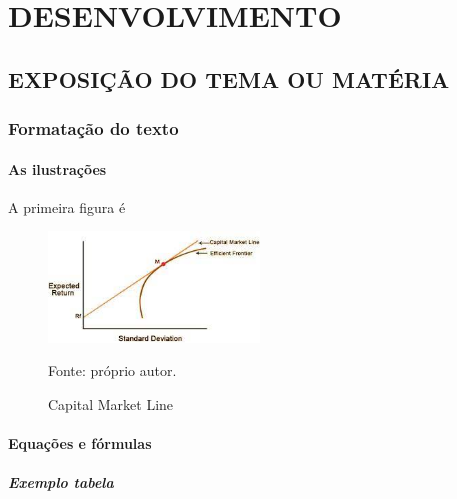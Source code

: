 \section{DESENVOLVIMENTO}
    \subsection{EXPOSIÇÃO DO TEMA OU MATÉRIA}
    \subsubsection{Formatação do texto}
    \paragraph{As ilustrações}

        \noindent A primeira figura é 

        \begin{figure}[htp]
            \centering
            \caption{Capital Market Line}
            \includegraphics[width=0.5\textwidth]{./imagens/cml.jpg}
            \par \footnotesize Fonte: próprio autor.
            \label{fig:cml}
        \end{figure}


    \paragraph{Equações e fórmulas}
    
    \subparagraph{Exemplo tabela}
        
